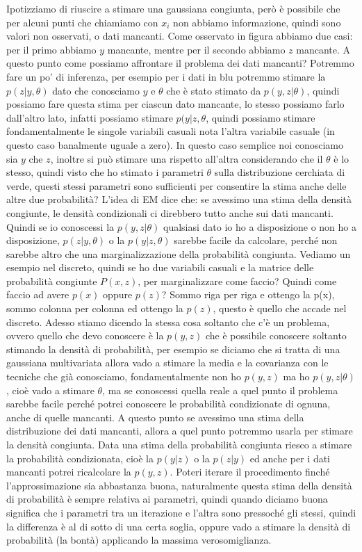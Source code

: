 Ipotizziamo di riuscire a stimare una gaussiana congiunta, però è possibile che per alcuni punti che chiamiamo con $x_i$ non abbiamo informazione, quindi sono valori non osservati, o dati mancanti. Come osservato in figura abbiamo due casi: per il primo abbiamo $y$ mancante, mentre per il secondo abbiamo $z$ mancante. A questo punto come possiamo affrontare il problema dei dati mancanti? Potremmo fare un po' di inferenza, per esempio per i dati in blu potremmo stimare la $p(z|y, \theta)$ dato che conosciamo $y$ e $\theta$ che è stato stimato da $p(y,z|\theta)$, quindi possiamo fare questa stima per ciascun dato mancante, lo stesso possiamo farlo dall'altro lato, infatti possiamo stimare $p(y|z, \theta$, quindi possiamo stimare fondamentalmente le singole variabili casuali nota l'altra variabile casuale (in questo caso banalmente uguale a zero). In questo caso semplice noi conosciamo sia $y$ che $z$, inoltre si può stimare una rispetto all'altra considerando che il $\theta$ è lo stesso, quindi visto che ho stimato i parametri $\theta$ sulla distribuzione cerchiata di verde, questi stessi parametri  sono sufficienti per consentire la stima anche delle altre due probabilità? L'idea di EM dice che: se avessimo una stima della densità congiunte, le densità condizionali ci direbbero tutto anche sui dati mancanti. Quindi se io conoscessi la $p(y,z|\theta)$ qualsiasi dato io ho a disposizione o non ho a disposizione, $p(z|y, \theta)$ o la $p(y|z, \theta)$ sarebbe facile da calcolare, perché non sarebbe altro che una marginalizzazione della probabilità congiunta. Vediamo un esempio nel discreto, quindi se ho due variabili casuali e la matrice delle probabilità congiunte $P(x,z)$, per marginalizzare come faccio? Quindi come faccio ad avere $p(x)$ oppure $p(z)$? Sommo riga per riga e ottengo la p(x), sommo colonna per colonna ed ottengo la $p(z)$, questo è quello che accade nel discreto. Adesso stiamo dicendo la stessa cosa soltanto che c'è un problema, ovvero quello che devo conoscere è la $p(y,z)$ che è possibile conoscere soltanto stimando la densità di probabilità, per esempio se diciamo che si tratta di una gaussiana multivariata allora vado a stimare la media e la covarianza con le tecniche che già conosciamo, fondamentalmente non ho $p(y,z)$ ma ho $p(y,z|\theta)$, cioè vado a stimare $\theta$, ma se conoscessi quella reale a quel punto il problema sarebbe facile perché potrei conoscere le probabilità condizionate di ognuna, anche di quelle mancanti. A questo punto se avessimo una stima della distribuzione dei dati mancanti, allora a quel punto potremmo usarla per stimare la densità congiunta. Data una stima della probabilità congiunta riesco a stimare la probabilità condizionata, cioè la $p(y|z)$ o la $p(z|y)$ ed anche per i dati mancanti potrei ricalcolare la $p(y,z)$.  Poteri iterare il procedimento finché l'approssimazione sia abbastanza buona, naturalmente questa stima della densità di probabilità è sempre relativa ai parametri, quindi quando diciamo buona significa che i parametri tra un iterazione e l'altra sono pressoché gli stessi, quindi la differenza è al di sotto di una certa soglia, oppure vado a stimare la densità di probabilità (la bontà) applicando la massima verosomiglianza. \\

